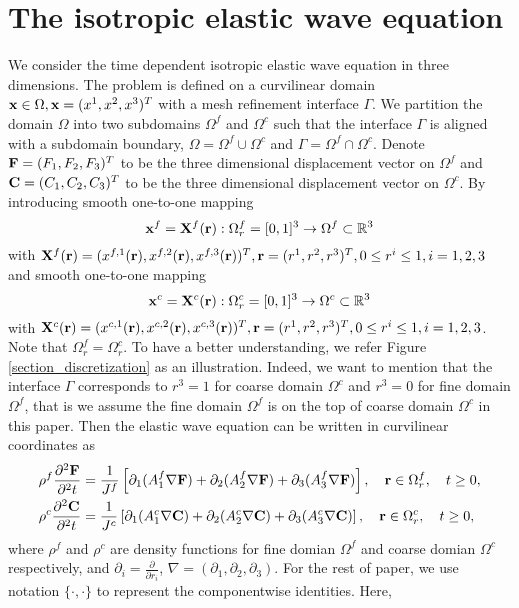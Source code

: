 \section{The isotropic elastic wave equation }
We consider the time dependent isotropic elastic wave equation in three dimensions. The problem is defined on a curvilinear domain ${\bf x}\in\Omega, {\bf x} = (x^{1},x^{2},x^{3})^T$ with a mesh refinement interface $\Gamma$.  We partition the domain $\Omega$ into two subdomains $\Omega^f$ and $\Omega^c$ such that the interface $\Gamma$ is aligned with a subdomain boundary, $\Omega = \Omega^f\cup\Omega^c$ and $\Gamma = \Omega^f\cap\Omega^c$. Denote ${\bf F} = (F_1,F_2,F_3)^T$ to be the three dimensional displacement vector on $\Omega^f$ and ${\bf C} = (C_1,C_2,C_3)^T$ to be the three dimensional displacement vector on $\Omega^c$. By introducing smooth one-to-one mapping
\[{\bf x}^{f} = {\bf X}^{f}({\bf r}) : \Omega^f_r = [0,1]^3 \rightarrow \Omega^{f} \subset \mathbb{R}^3 \]
with ${\bf X}^{f}({\bf r}) = (x^{f,1}({\bf r}),x^{f,2}({\bf r}),x^{f,3}({\bf r}))^T, {\bf r} = (r^{1},r^{2},r^{3})^T, 0\leq r^{i}\leq1, i = 1,2,3$
and smooth one-to-one mapping 
\[{\bf x}^{c} = {\bf X}^{c}({\bf r}) : \Omega^c_r = [0,1]^3 \rightarrow \Omega^{c} \subset \mathbb{R}^3\]
 with ${\bf X}^{c}({\bf r}) = (x^{c,1}({\bf r}),x^{c,2}({\bf r}),x^{c,3}({\bf r}))^T, {\bf r} = (r^{1},r^{2},r^{3})^T, 0\leq r^{i}\leq1, i = 1,2,3$. Note that $\Omega^f_r = \Omega^c_r$. To have a better understanding, we refer Figure \ref{section_discretization} as an illustration. Indeed, we want to mention that the interface $\Gamma$ corresponds to $r^3 = 1$ for coarse domain $\Omega^c$ and $r^3 = 0$ for fine domain $\Omega^f$, that is we assume the fine domain $\Omega^f$ is on the top of coarse domain $\Omega^c$ in this paper. Then the elastic wave equation can be written in curvilinear coordinates as
\begin{align}\label{elastic_curvi}
	\rho^f\frac{\partial^2{\bf F}}{\partial^2 t} &= \frac{1}{J^f}\left[\partial_1(A_1^f\nabla{\bf F}) + \partial_2(A_2^f\nabla{\bf F}) +\partial_3(A_3^f\nabla{\bf F}) \right], \ \ \  {\bf r}\in\Omega^f_r,\ \ \  t\geq0,\nonumber\\
	\rho^c\frac{\partial^2{\bf C}}{\partial^2 t} &= \frac{1}{J^c}\left[\partial_1(A_1^c\nabla{\bf C}) + \partial_2(A_2^c\nabla{\bf C}) +\partial_3(A_3^c\nabla{\bf C}) \right],\ \ \  {\bf r}\in\Omega^c_r,\ \ \  t\geq0,
\end{align}
where $\rho^f$ and $\rho^c$ are density functions for fine domian $\Omega^f$ and coarse domian $\Omega^c$ respectively, and $\partial_i = \frac{\partial}{\partial r_i}$, $\nabla = (\partial_1,\partial_2,\partial_3)$. For the rest of paper, we use notation $\{\cdot,\cdot\}$ to represent the componentwise identities. Here,
